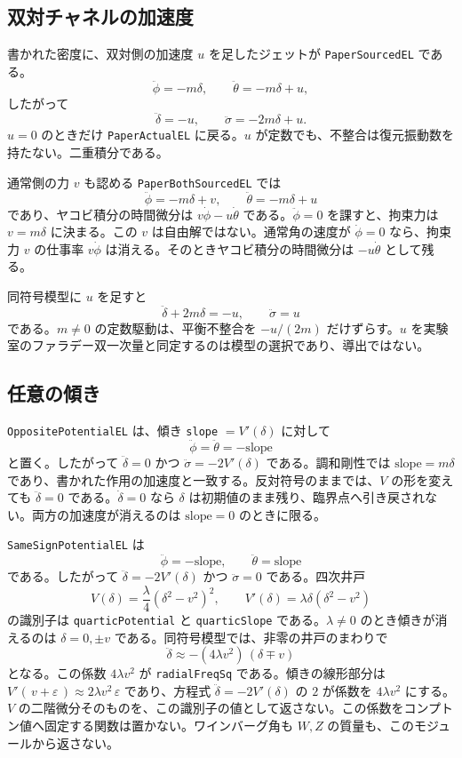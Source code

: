 \subsection{双対チャネルの加速度}

書かれた密度に、双対側の加速度 \(u\) を足したジェットが \texttt{PaperSourcedEL} である。
\[
\ddot\phi=-m\delta,\qquad
\ddot\theta=-m\delta+u,
\]
したがって
\[
\ddot\delta=-u,\qquad
\ddot\sigma=-2m\delta+u.
\]
\(u=0\) のときだけ \texttt{PaperActualEL} に戻る。\(u\) が定数でも、不整合は復元振動数を持たない。二重積分である。

通常側の力 \(v\) も認める \texttt{PaperBothSourcedEL} では
\[
\ddot\phi=-m\delta+v,\qquad
\ddot\theta=-m\delta+u
\]
であり、ヤコビ積分の時間微分は \(v\dot\phi-u\dot\theta\) である。\(\ddot\phi=0\) を課すと、拘束力は \(v=m\delta\) に決まる。この \(v\) は自由解ではない。通常角の速度が \(\dot\phi=0\) なら、拘束力 \(v\) の仕事率 \(v\dot\phi\) は消える。そのときヤコビ積分の時間微分は \(-u\dot\theta\) として残る。

同符号模型に \(u\) を足すと
\[
\ddot\delta+2m\delta=-u,\qquad \ddot\sigma=u
\]
である。\(m\neq 0\) の定数駆動は、平衡不整合を \(-u/(2m)\) だけずらす。\(u\) を実験室のファラデー双一次量と同定するのは模型の選択であり、導出ではない。

\subsection{任意の傾き}

\texttt{OppositePotentialEL} は、傾き \texttt{slope} \(=V'(\delta)\) に対して
\[
\ddot\phi=\ddot\theta=-\mathrm{slope}
\]
と置く。したがって \(\ddot\delta=0\) かつ \(\ddot\sigma=-2V'(\delta)\) である。調和剛性では \(\mathrm{slope}=m\delta\) であり、書かれた作用の加速度と一致する。反対符号のままでは、\(V\) の形を変えても \(\ddot\delta=0\) である。\(\dot\delta=0\) なら \(\delta\) は初期値のまま残り、臨界点へ引き戻されない。両方の加速度が消えるのは \(\mathrm{slope}=0\) のときに限る。

\texttt{SameSignPotentialEL} は
\[
\ddot\phi=-\mathrm{slope},\qquad \ddot\theta=\mathrm{slope}
\]
である。したがって \(\ddot\delta=-2V'(\delta)\) かつ \(\ddot\sigma=0\) である。四次井戸
\[
V(\delta)=\frac\lambda4(\delta^2-v^2)^2,\qquad
V'(\delta)=\lambda\delta(\delta^2-v^2)
\]
の識別子は \texttt{quarticPotential} と \texttt{quarticSlope} である。\(\lambda\neq 0\) のとき傾きが消えるのは \(\delta=0,\pm v\) である。同符号模型では、非零の井戸のまわりで
\[
\ddot\delta\approx-(4\lambda v^2)\,(\delta\mp v)
\]
となる。この係数 \(4\lambda v^2\) が \texttt{radialFreqSq} である。傾きの線形部分は \(V'(\,v+\varepsilon\,)\approx 2\lambda v^2\,\varepsilon\) であり、方程式 \(\ddot\delta=-2V'(\delta)\) の \(2\) が係数を \(4\lambda v^2\) にする。\(V\) の二階微分そのものを、この識別子の値として返さない。この係数をコンプトン値へ固定する関数は置かない。ワインバーグ角も \(W,Z\) の質量も、このモジュールから返さない。

